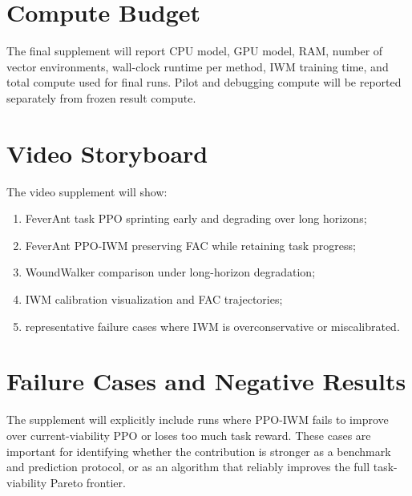 \documentclass{article}
\begin{document}
\section{Compute Budget}

The final supplement will report CPU model, GPU model, RAM, number of vector
environments, wall-clock runtime per method, IWM training time, and total compute
used for final runs.  Pilot and debugging compute will be reported separately
from frozen result compute.

\section{Video Storyboard}

The video supplement will show:
\begin{enumerate}
    \item FeverAnt task PPO sprinting early and degrading over long horizons;
    \item FeverAnt PPO-IWM preserving FAC while retaining task progress;
    \item WoundWalker comparison under long-horizon degradation;
    \item IWM calibration visualization and FAC trajectories;
    \item representative failure cases where IWM is overconservative or
    miscalibrated.
\end{enumerate}

\section{Failure Cases and Negative Results}

The supplement will explicitly include runs where PPO-IWM fails to improve over
current-viability PPO or loses too much task reward.  These cases are important
for identifying whether the contribution is stronger as a benchmark and
prediction protocol, or as an algorithm that reliably improves the full
task-viability Pareto frontier.
\end{document}

